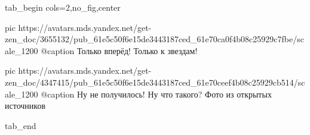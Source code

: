  
 
 
 
 


\ifcmt
  tab_begin cols=2,no_fig,center

     pic https://avatars.mds.yandex.net/get-zen_doc/3655132/pub_61e5c50f6e15de3443187ced_61e70ca0f4b08c25929c7fbe/scale_1200
		 @caption Только вперёд! Только к звездам!

		 pic https://avatars.mds.yandex.net/get-zen_doc/4347415/pub_61e5c50f6e15de3443187ced_61e70ceef4b08c25929cb514/scale_1200
		 @caption Ну не получилось! Ну что такого? Фото из открытых источников

  tab_end
\fi
